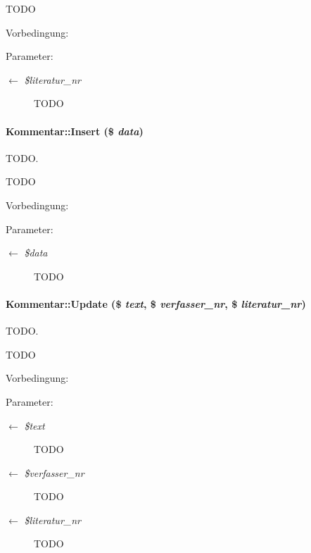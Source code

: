 TODO \begin{Desc}
\item[Vorbedingung:]\end{Desc}
\begin{Desc}
\item[Parameter:]
\begin{description}
\item[\mbox{$\leftarrow$} {\em \$literatur\_\-nr}]TODO \end{description}
\end{Desc}
\hypertarget{classKommentar_2cafefbbb7bddd9bc63ebe37bebcac1d}{
\paragraph[Insert]{\setlength{\rightskip}{0pt plus 5cm}Kommentar::Insert (\$ {\em data})}\hfill}
\label{classKommentar_2cafefbbb7bddd9bc63ebe37bebcac1d}


TODO. 

TODO \begin{Desc}
\item[Vorbedingung:]\end{Desc}
\begin{Desc}
\item[Parameter:]
\begin{description}
\item[\mbox{$\leftarrow$} {\em \$data}]TODO \end{description}
\end{Desc}
\hypertarget{classKommentar_074f62a61ba97457894fc52935724116}{
\paragraph[Update]{\setlength{\rightskip}{0pt plus 5cm}Kommentar::Update (\$ {\em text}, \$ {\em verfasser\_\-nr}, \$ {\em literatur\_\-nr})}\hfill}
\label{classKommentar_074f62a61ba97457894fc52935724116}


TODO. 

TODO \begin{Desc}
\item[Vorbedingung:]\end{Desc}
\begin{Desc}
\item[Parameter:]
\begin{description}
\item[\mbox{$\leftarrow$} {\em \$text}]TODO \item[\mbox{$\leftarrow$} {\em \$verfasser\_\-nr}]TODO \item[\mbox{$\leftarrow$} {\em \$literatur\_\-nr}]TODO \end{description}
\end{Desc}


